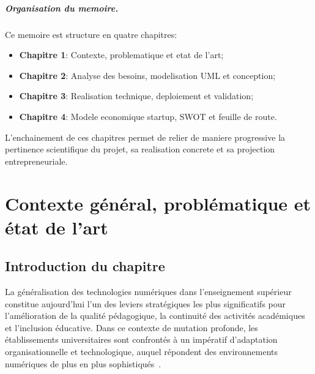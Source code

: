 ﻿\documentclass[12pt,a4paper,oneside]{report}
\begin{document}
\paragraph{Organisation du memoire.}
Ce memoire est structure en quatre chapitres:
\begin{itemize}
  \item \textbf{Chapitre 1}: Contexte, problematique et etat de l'art;
  \item \textbf{Chapitre 2}: Analyse des besoins, modelisation UML et conception;
  \item \textbf{Chapitre 3}: Realisation technique, deploiement et validation;
  \item \textbf{Chapitre 4}: Modele economique startup, SWOT et feuille de route.
\end{itemize}

L'enchainement de ces chapitres permet de relier de maniere progressive la pertinence scientifique du projet, sa realisation concrete et sa projection entrepreneuriale.


\chapter{Contexte g\'en\'eral, probl\'ematique et \'etat de l'art}

\section{Introduction du chapitre}

La g\'en\'eralisation des technologies num\'eriques dans l'enseignement sup\'erieur constitue aujourd'hui l'un des leviers strat\'egiques les plus significatifs pour l'am\'elioration de la qualit\'e p\'edagogique, la continuit\'e des activit\'es acad\'emiques et l'inclusion \'educative. Dans ce contexte de mutation profonde, les \'etablissements universitaires sont confront\'es \`a un imp\'eratif d'adaptation organisationnelle et technologique, auquel r\'epondent des environnements num\'eriques de plus en plus sophistiqu\'es~\cite{unesco_digital_2026,worldbank_edtech_2026}.
\end{document}
